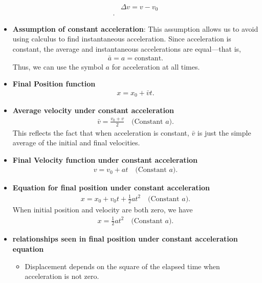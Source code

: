 \documentclass{report}
\begin{document}
\begin{itemize}
\begin{align*}
                &\Delta v = v- v_{0}\\
            .\end{align*}
        \item \textbf{Assumption of constant acceleration}: This assumption allows us to avoid using calculus to find instantaneous acceleration. Since acceleration is constant, the average and instantaneous accelerations are equal—that is,
            \begin{align*}
                \bar{a} = a = \text{constant}
            .\end{align*}
            Thus, we can use the symbol $a$ for acceleration at all times.
        \item \textbf{Final Position function} 
            \begin{align*}
                x = x_{0}  + \bar{v}t
            .\end{align*}
        \item \textbf{Average velocity under constant acceleration}
            \begin{align*}
                \bar{v} = \frac{v_{0} + v}{2} \quad \text{(Constant $a$)}
            .\end{align*}
            This reflects the fact that when acceleration is constant, $\bar{v}$ is just the simple average of the initial and final velocities.
        \item \textbf{Final Velocity function under constant acceleration}
            \begin{align*}
                v = v_{0} + at \quad \text{(Constant $a$)}
            .\end{align*}
        \item \textbf{Equation for final position under constant acceleration}
            \begin{align*}
                x = x_{0} +v_{0}t + \frac{1}{2}at^{2} \quad \text{(Constant $a$)}
            .\end{align*}
            When initial position and velocity are both zero, we have
            \begin{align*}
                x =  \frac{1}{2}at^{2} \quad \text{(Constant $a$)}
            .\end{align*}
        \item \textbf{relationships seen in final position under constant acceleration equation}
            \begin{itemize}
                \item Displacement depends on the square of the elapsed time when acceleration is not zero.

\end{itemize}
\end{itemize}
\end{document}
